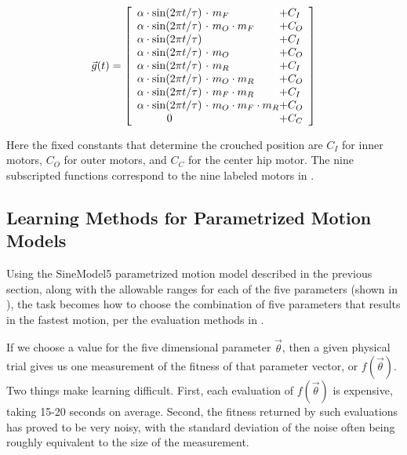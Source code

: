 \[
\vec{g}(t) =
\left[ {\begin{array}{c@{ }l@{ }l}
\amp \cdot \sin(2\pi t / \tau) & \ \cdot \           m_F            & + C_I \\ %
\amp \cdot \sin(2\pi t / \tau) & \ \cdot \ m_O \cdot m_F            & + C_O \\ %
\amp \cdot \sin(2\pi t / \tau) & \                                  & + C_I \\ %
\amp \cdot \sin(2\pi t / \tau) & \ \cdot \ m_O                      & + C_O \\ %
\amp \cdot \sin(2\pi t / \tau) & \ \cdot \                     m_R  & + C_I \\ %
\amp \cdot \sin(2\pi t / \tau) & \ \cdot \ m_O           \cdot m_R  & + C_O \\ %
\amp \cdot \sin(2\pi t / \tau) & \ \cdot \           m_F \cdot m_R  & + C_I \\ %
\amp \cdot \sin(2\pi t / \tau) & \ \cdot \ m_O \cdot m_F \cdot m_R  & + C_O \\ %
0                              & \                                  & + C_C \\ %
\end{array} } \right]
\]

\noindent Here the fixed constants that determine the crouched
position are $C_I$ for inner motors, $C_O$ for outer motors, and $C_C$
for the center hip motor.  The nine subscripted functions correspond
to the nine labeled motors in .




\subsection{Learning Methods for Parametrized Motion Models}

Using the SineModel5 parametrized motion model described in the
previous section, along with the allowable ranges for each of the five
parameters (shown in ), the task becomes how to
choose the combination of five parameters that results in the fastest
motion, per the evaluation methods in .

If we choose a value for the five dimensional parameter
$\vec{\theta}$, then a given physical trial gives us one measurement
of the fitness of that parameter vector, or $f(\vec{\theta})$.  Two
things make learning difficult.  First, each evaluation of
$f(\vec{\theta})$ is expensive, taking 15-20 seconds on
average.  Second, the fitness returned by such evaluations has proved
to be very noisy, with the standard deviation of the noise often being
roughly equivalent to the size of the measurement.

